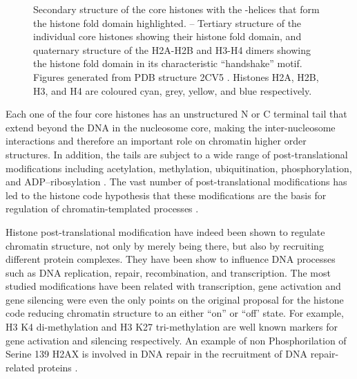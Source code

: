 \begin{figure}
                     {
                       Secondary structure of the core histones with
                       the \textalpha-helices that form the histone
                       fold domain highlighted.
                       --%
                       Tertiary structure of the individual core
                       histones showing their histone fold domain, and
                       quaternary structure of the H2A-H2B and H3-H4
                       dimers showing the histone fold domain in its
                       characteristic ``handshake'' motif.  Figures
                       generated from PDB structure 2CV5
                       \citep{tsunaka2005-2cv5}.  Histones H2A, H2B,
                       H3, and H4 are coloured cyan, grey, yellow, and
                       blue respectively.}
      \end{figure}


      Each one of the four core histones has an unstructured N or C
      terminal tail that extend beyond the DNA in the nucleosome core,
      making the inter-nucleosome interactions and therefore an important
      role on chromatin higher order structures.
      In addition, the tails are subject to a wide range of
      post-translational modifications
      including acetylation, methylation, ubiquitination, phosphorylation,
      and ADP--ribosylation \citep{bannister2011ptm-review}.
      The vast number of post-translational modifications has led to the
      histone code hypothesis that these modifications are the basis for
      regulation of chromatin-templated processes \citep{jenuwein200histone-code}.


      Histone post-translational modification have indeed been shown to
      regulate chromatin structure, not only by merely being there, but
      also by recruiting different protein complexes.
      They have been show to influence
      DNA processes such as DNA replication, repair, recombination,
      and transcription.
      The most studied modifications have been related with transcription,
      gene activation and gene silencing were even the only points
      on the original proposal for the histone code \citep{jenuwein200histone-code}
      reducing chromatin structure to an either ``on'' or ``off' state.
      For example,
      H3 K4 di-methylation and H3 K27 tri-methylation are well known
      markers for gene activation and silencing respectively.
      An example of non
      Phosphorilation of Serine 139 H2AX is involved in DNA repair
      in the recruitment of DNA repair-related proteins .

